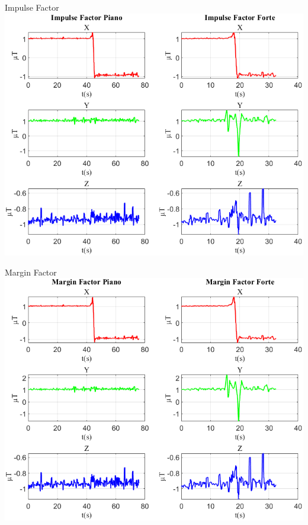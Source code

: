 	\begin{frame}{{Impulse Factor}}
		\centering\includegraphics[height=.8\textheight]{figure/Mag/Impulse Factor}
	\end{frame}
	
	\begin{frame}{{Margin Factor}}
		\centering\includegraphics[height=.8\textheight]{figure/Mag/Margin Factor}
	\end{frame}
	
